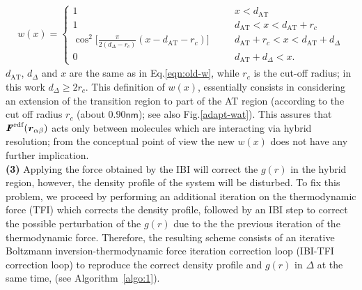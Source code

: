 \documentclass[aps,pre,preprint]{revtex4}
\renewcommand{\v}[1]{\textbf{\textit{#1}}}
\begin{document}
\begin{align}\label{eqn:new-w}
  w(x) =
  \left\{
    \begin{array}{lcl}
      1 &\quad& x < d_{\textrm{AT}}\\
      1  && d_{\textrm{AT}} < x < d_{\textrm{AT}} + r_c\\
      \cos^2\big[\frac{\pi}{2(d_{{\Delta}} - r_c)} (x - d_{\textrm{AT}} - r_c)\big] && d_{\textrm{AT}} + r_c < x < d_{\textrm{AT}} + d_{{\Delta}} \\
      0 && d_{\textrm{AT}} + d_{{\Delta}}  < x.
    \end{array}
  \right.
\end{align}
$d_{\textrm{AT}}$, $d_{{\Delta}}$ and $x$ are the same as in Eq.\ref{eqn:old-w}, while $r_c$ is the cut-off
radius; in this work $d_{{\Delta}} \geq 2r_c$.  This definition of $w(x)$, essentially consists in considering an extension of the transition region to part of the AT region (according to the cut off radius $r_c$ (about $0.90\textsf{nm}$); see also Fig.\ref{adapt-wat}). This assures that $\v F^{\textrm{rdf}}(\v r_{\alpha\beta})$ acts only between molecules which are interacting via hybrid resolution; from the conceptual point of view the new $w(x)$ does not have any further implication.\\
{\bf (3)}  Applying the force obtained by the IBI will correct the $g(r)$ in the hybrid region, however,
the density profile of the system will be disturbed.
To fix this problem, we proceed by performing an additional iteration on the thermodynamic force (TFI) which corrects the density profile,
followed by an IBI step to correct the possible perturbation
of the $g(r)$ due to the the previous iteration of the thermodynamic force.
Therefore, the resulting scheme consists of an iterative
Boltzmann inversion-thermodynamic force iteration correction loop
(IBI-TFI correction loop) to reproduce the correct density
profile and $g(r)$ in $\Delta$ at the same time, (see Algorithm~\ref{algo:1}). 
\end{document}
